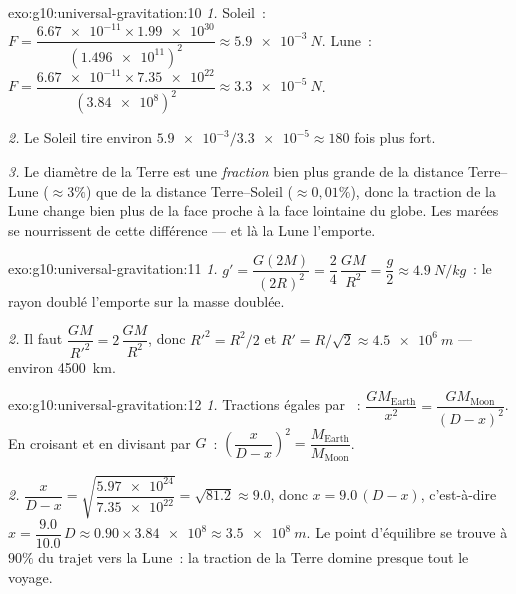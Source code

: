 \begin{solution}{exo:g10:universal-gravitation:10}
\emph{1.} Soleil~:
$F = \dfrac{\num{6.67e-11} \times \num{1.99e30}}{(\num{1.496e11})^2}
\approx \qty{5.9e-3}{N}$. Lune~:
$F = \dfrac{\num{6.67e-11} \times \num{7.35e22}}{(\num{3.84e8})^2}
\approx \qty{3.3e-5}{N}$.

\emph{2.} Le Soleil tire environ $\num{5.9e-3}/\num{3.3e-5} \approx 180$
fois plus fort.

\emph{3.} Le diamètre de la Terre est une \emph{fraction} bien plus
grande de la distance Terre--Lune ($\approx 3\%$) que de la distance
Terre--Soleil ($\approx 0{,}01\%$), donc la traction de la Lune change
bien plus de la face proche à la face lointaine du globe. Les marées
se nourrissent de cette différence --- et là la Lune l'emporte.
\end{solution}

\begin{solution}{exo:g10:universal-gravitation:11}
\emph{1.} $g' = \dfrac{G (2M)}{(2R)^2} = \dfrac{2}{4}\,\dfrac{GM}{R^2}
= \dfrac{g}{2} \approx \qty{4.9}{N/kg}$~: le rayon doublé l'emporte
sur la masse doublée.

\emph{2.} Il faut $\dfrac{GM}{R'^2} = 2\,\dfrac{GM}{R^2}$, donc
$R'^2 = R^2/2$ et $R' = R/\sqrt{2} \approx \qty{4.5e6}{m}$ --- environ
\qty{4500}{km}.
\end{solution}

\begin{solution}{exo:g10:universal-gravitation:12}
\emph{1.} Tractions égales par ~:
$\dfrac{G M_{\text{Earth}}}{x^2} = \dfrac{G M_{\text{Moon}}}{(D-x)^2}$.
En croisant et en divisant par $G$~:
$\left(\dfrac{x}{D-x}\right)^2 = \dfrac{M_{\text{Earth}}}{M_{\text{Moon}}}$.

\emph{2.} $\dfrac{x}{D-x}
= \sqrt{\dfrac{\num{5.97e24}}{\num{7.35e22}}} = \sqrt{81.2} \approx
9.0$, donc $x = 9.0\,(D - x)$, c'est-à-dire $x = \dfrac{9.0}{10.0}\,D
\approx 0.90 \times \num{3.84e8} \approx \qty{3.5e8}{m}$. Le point
d'équilibre se trouve à $90\%$ du trajet vers la Lune~: la traction de
la Terre domine presque tout le voyage.
\end{solution}

